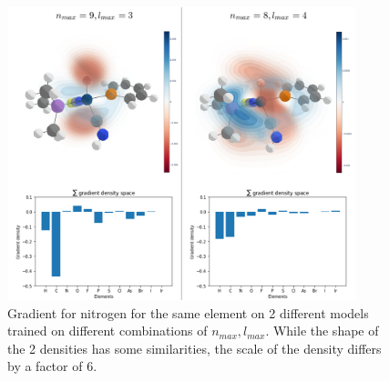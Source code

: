 \begin{figure}[hb]
  \centering
  \includegraphics[width=0.9\textwidth]{figures/evaluation/Gradient-model-comp.png}
  \caption[Comparison of gradients between different models]{
      Gradient for nitrogen for the same element on 2 different models trained on different combinations of $n_{max}, l_{max}$.
      While the shape of the 2 densities has some similarities, the scale of the density differs by a factor of 6.
   }
  \label{fig:snap-gradient-model}
\end{figure}